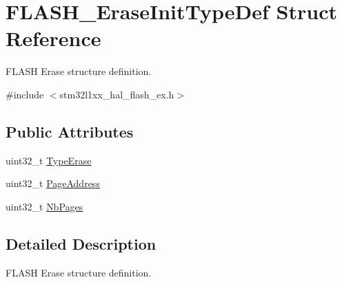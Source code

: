 \hypertarget{struct_f_l_a_s_h___erase_init_type_def}{\section{F\-L\-A\-S\-H\-\_\-\-Erase\-Init\-Type\-Def Struct Reference}
\label{struct_f_l_a_s_h___erase_init_type_def}
}


F\-L\-A\-S\-H Erase structure definition.  




{\ttfamily \#include $<$stm32l1xx\-\_\-hal\-\_\-flash\-\_\-ex.\-h$>$}

\subsection*{Public Attributes}
\begin{DoxyCompactItemize}
\item 
uint32\-\_\-t \hyperlink{struct_f_l_a_s_h___erase_init_type_def_a5d08471046a663db76d2252848a7d66c}{Type\-Erase}
\item 
uint32\-\_\-t \hyperlink{struct_f_l_a_s_h___erase_init_type_def_ab078898fc3e86294ce8335f6c03387b1}{Page\-Address}
\item 
uint32\-\_\-t \hyperlink{struct_f_l_a_s_h___erase_init_type_def_ad18bd4b3caaccd0d51a4faf3c6b3b57f}{Nb\-Pages}
\end{DoxyCompactItemize}


\subsection{Detailed Description}
F\-L\-A\-S\-H Erase structure definition. 

